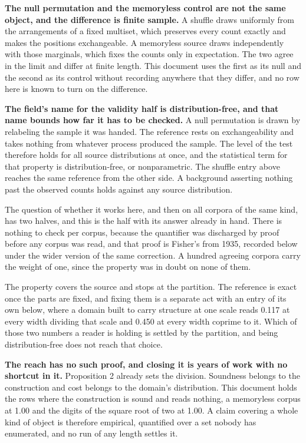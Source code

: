\textbf{The null permutation and the memoryless control are not the same object, and the difference is finite sample.} A shuffle draws uniformly from the arrangements of a fixed multiset, which preserves every count exactly and makes the positions exchangeable. A memoryless source draws independently with those marginals, which fixes the counts only in expectation. The two agree in the limit and differ at finite length. This document uses the first as its null and the second as its control without recording anywhere that they differ, and no row here is known to turn on the difference.

\textbf{The field's name for the validity half is distribution-free, and that name bounds how far it has to be checked.} A null permutation is drawn by relabeling the sample it was handed. The reference rests on exchangeability and takes nothing from whatever process produced the sample. The level of the test therefore holds for all source distributions at once, and the statistical term for that property is distribution-free, or nonparametric. The shuffle entry above reaches the same reference from the other side. A background asserting nothing past the observed counts holds against any source distribution.

The question of whether it works here, and then on all corpora of the same kind, has two halves, and this is the half with its answer already in hand. There is nothing to check per corpus, because the quantifier was discharged by proof before any corpus was read, and that proof is Fisher's from 1935, recorded below under the wider version of the same correction. A hundred agreeing corpora carry the weight of one, since the property was in doubt on none of them.

The property covers the source and stops at the partition. The reference is exact once the parts are fixed, and fixing them is a separate act with an entry of its own below, where a domain built to carry structure at one scale reads 0.117 at every width dividing that scale and 0.450 at every width coprime to it. Which of those two numbers a reader is holding is settled by the partition, and being distribution-free does not reach that choice.

\textbf{The reach has no such proof, and closing it is years of work with no shortcut in it.} Proposition 2 already sets the division. Soundness belongs to the construction and cost belongs to the domain's distribution. This document holds the rows where the construction is sound and reads nothing, a memoryless corpus at 1.00 and the digits of the square root of two at 1.00. A claim covering a whole kind of object is therefore empirical, quantified over a set nobody has enumerated, and no run of any length settles it.

